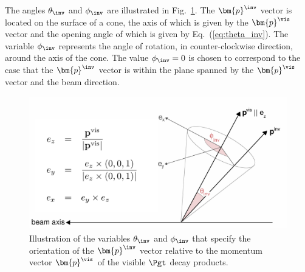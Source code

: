 The angles $\theta_{\inv}$ and $\phi_{\inv}$ are illustrated in Fig.~\ref{fig:tauDecayParametrization}.
The $\bm{p}^{\inv}$ vector is located on the surface of a cone,
the axis of which is given by the $\bm{p}^{\vis}$ vector and the
opening angle of which is given by Eq.~(\ref{eq:theta_inv}).
The variable $\phi_{\inv}$ represents the angle of rotation, in
counter-clockwise direction, around the
axis of the cone.
The value $\phi_{\inv} = 0$ is chosen to correspond to the case that
the $\bm{p}^{\inv}$ vector is within the plane spanned by the
$\bm{p}^{\vis}$ vector and the beam direction.

\begin{figure}[h]
\begin{center}
\includegraphics*[height=58mm]{figures/tauDecayParametrization.pdf}
\end{center}
\caption{
  Illustration of the variables $\theta_{\inv}$ and $\phi_{\inv}$ that specify the orientation of the $\bm{p}^{\inv}$ vector
  relative to the momentum vector $\bm{p}^{\vis}$ of the visible $\Pgt$ decay products.
}
\label{fig:tauDecayParametrization}
\end{figure} 


